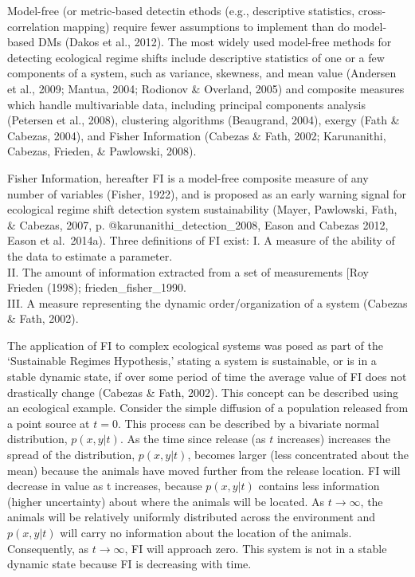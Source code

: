 \documentclass[12pt,twoside]{reedthesis}
\begin{document}
Model-free (or metric-based detectin ethods (e.g., descriptive statistics, cross-correlation mapping) require fewer assumptions to implement than do model-based DMs (Dakos et al., 2012). The most widely used model-free methods for detecting ecological regime shifts include descriptive statistics of one or a few components of a system, such as variance, skewness, and mean value (Andersen et al., 2009; Mantua, 2004; Rodionov \& Overland, 2005) and composite measures which handle multivariable data, including principal components analysis (Petersen et al., 2008), clustering algorithms (Beaugrand, 2004), exergy (Fath \& Cabezas, 2004), and Fisher Information (Cabezas \& Fath, 2002; Karunanithi, Cabezas, Frieden, \& Pawlowski, 2008).

Fisher Information, hereafter FI is a model-free composite measure of any number of variables (Fisher, 1922), and is proposed as an early warning signal for ecological regime shift detection system sustainability (Mayer, Pawlowski, Fath, \& Cabezas, 2007, p. @karunanithi\_detection\_2008, Eason and Cabezas 2012, Eason et al.~2014a). Three definitions of FI exist:
I. A measure of the ability of the data to estimate a parameter.\\
II. The amount of information extracted from a set of measurements {[}Roy Frieden (1998); frieden\_fisher\_1990\protect\hyperlink{section}{}.\\
III. A measure representing the dynamic order/organization of a system (Cabezas \& Fath, 2002).

The application of FI to complex ecological systems was posed as part of the `Sustainable Regimes Hypothesis,' stating a system is sustainable, or is in a stable dynamic state, if over some period of time the average value of FI does not drastically change (Cabezas \& Fath, 2002). This concept can be described using an ecological example. Consider the simple diffusion of a population released from a point source at \(t = 0\). This process can be described by a bivariate normal distribution, \(p(x,y\vert t)\). As the time since release (as \(t\) increases) increases the spread of the distribution, \(p(x,y\vert t)\), becomes larger (less concentrated about the mean) because the animals have moved further from the release location. FI will decrease in value as t increases, because \(p(x,y\vert t)\) contains less information (higher uncertainty) about where the animals will be located. As \(t→\infty\), the animals will be relatively uniformly distributed across the environment and \(p(x,y\vert t)\) will carry no information about the location of the animals. Consequently, as \(t→\infty\), FI will approach zero. This system is not in a stable dynamic state because FI is decreasing with time.
\end{document}

